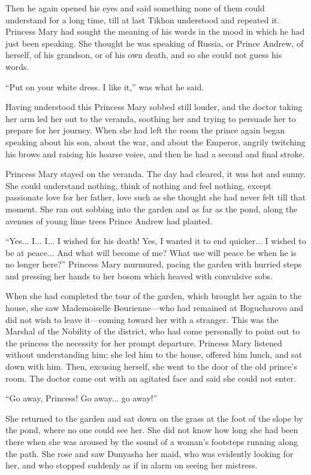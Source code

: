 Then he again opened his eyes and said something none of them
could understand for a long time, till at last Tikhon understood
and repeated it. Princess Mary had sought the meaning of his
words in the mood in which he had just been speaking. She thought
he was speaking of Russia, or Prince Andrew, of herself, of his
grandson, or of his own death, and so she could not guess his
words.

``Put on your white dress. I like it,'' was what he said.

Having understood this Princess Mary sobbed still louder, and the
doctor taking her arm led her out to the veranda, soothing her
and trying to persuade her to prepare for her journey. When she
had left the room the prince again began speaking about his son,
about the war, and about the Emperor, angrily twitching his brows
and raising his hoarse voice, and then he had a second and final
stroke.

Princess Mary stayed on the veranda. The day had cleared, it was
hot and sunny. She could understand nothing, think of nothing and
feel nothing, except passionate love for her father, love such as
she thought she had never felt till that moment. She ran out
sobbing into the garden and as far as the pond, along the avenues
of young lime trees Prince Andrew had planted.

``Yes... I... I... I wished for his death! Yes, I wanted it to
end quicker... I wished to be at peace... And what will become of
me? What use will peace be when he is no longer here?'' Princess
Mary murmured, pacing the garden with hurried steps and pressing
her hands to her bosom which heaved with convulsive sobs.

When she had completed the tour of the garden, which brought her
again to the house, she saw Mademoiselle Bourienne---who had
remained at Bogucharovo and did not wish to leave it---coming
toward her with a stranger. This was the Marshal of the Nobility
of the district, who had come personally to point out to the
princess the necessity for her prompt departure. Princess Mary
listened without understanding him; she led him to the house,
offered him lunch, and sat down with him. Then, excusing herself,
she went to the door of the old prince's room. The doctor came
out with an agitated face and said she could not enter.

``Go away, Princess! Go away... go away!''

She returned to the garden and sat down on the grass at the foot
of the slope by the pond, where no one could see her. She did not
know how long she had been there when she was aroused by the
sound of a woman's footsteps running along the path. She rose and
saw Dunyasha her maid, who was evidently looking for her, and who
stopped suddenly as if in alarm on seeing her mistress.


